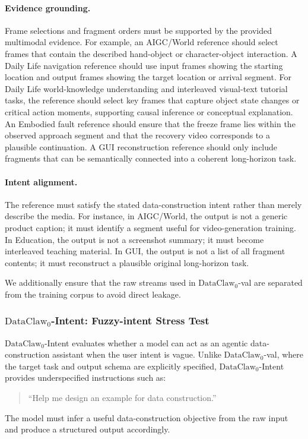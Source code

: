 \paragraph{Evidence grounding.}
Frame selections and fragment orders must be supported by the provided multimodal evidence. For example, an AIGC/World reference should select frames that contain the described hand-object or character-object interaction. A Daily Life navigation reference should use input frames showing the starting location and output frames showing the target location or arrival segment. For Daily Life world-knowledge understanding and interleaved visual-text tutorial tasks, the reference should select key frames that capture object state changes or critical action moments, supporting causal inference or conceptual explanation. An Embodied fault reference should ensure that the freeze frame lies within the observed approach segment and that the recovery video corresponds to a plausible continuation. A GUI reconstruction reference should only include fragments that can be semantically connected into a coherent long-horizon task.


\paragraph{Intent alignment.}
The reference must satisfy the stated data-construction intent rather than merely describe the media. For instance, in AIGC/World, the output is not a generic product caption; it must identify a segment useful for video-generation training. In Education, the output is not a screenshot summary; it must become interleaved teaching material. In GUI, the output is not a list of all fragment contents; it must reconstruct a plausible original long-horizon task.

We additionally ensure that the raw streams used in $\text{DataClaw}_0$-val are separated from the training corpus to avoid direct leakage.

\subsubsection{$\text{DataClaw}_0$-Intent: Fuzzy-intent Stress Test}
\label{app:fuzzy_intent}

$\text{DataClaw}_0$-Intent evaluates whether a model can act as an agentic data-construction assistant when the user intent is vague. Unlike $\text{DataClaw}_0$-val, where the target task and output schema are explicitly specified, $\text{DataClaw}_0$-Intent provides underspecified instructions such as:
\begin{quote}
\small
``Help me design an example for data construction.''
\end{quote}
The model must infer a useful data-construction objective from the raw input and produce a structured output accordingly.

